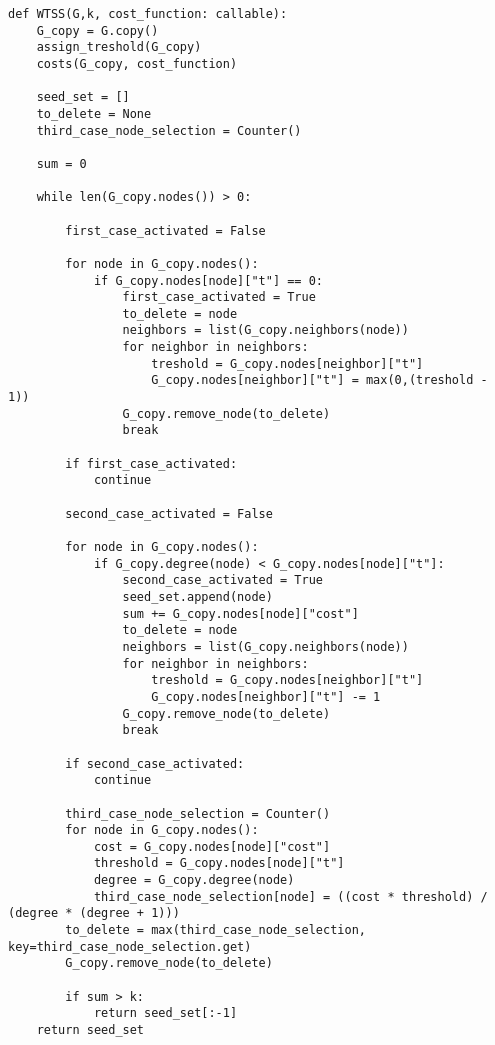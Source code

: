 \begin{code}
\begin{verbatim}
def WTSS(G,k, cost_function: callable):
    G_copy = G.copy()
    assign_treshold(G_copy)
    costs(G_copy, cost_function)

    seed_set = []
    to_delete = None
    third_case_node_selection = Counter()
    
    sum = 0

    while len(G_copy.nodes()) > 0:

        first_case_activated = False

        for node in G_copy.nodes():
            if G_copy.nodes[node]["t"] == 0:
                first_case_activated = True
                to_delete = node
                neighbors = list(G_copy.neighbors(node))
                for neighbor in neighbors:
                    treshold = G_copy.nodes[neighbor]["t"]
                    G_copy.nodes[neighbor]["t"] = max(0,(treshold - 1))
                G_copy.remove_node(to_delete)
                break
        
        if first_case_activated:
            continue

        second_case_activated = False

        for node in G_copy.nodes():
            if G_copy.degree(node) < G_copy.nodes[node]["t"]:
                second_case_activated = True
                seed_set.append(node)
                sum += G_copy.nodes[node]["cost"]
                to_delete = node
                neighbors = list(G_copy.neighbors(node))
                for neighbor in neighbors:
                    treshold = G_copy.nodes[neighbor]["t"]
                    G_copy.nodes[neighbor]["t"] -= 1
                G_copy.remove_node(to_delete)
                break
        
        if second_case_activated: 
            continue

        third_case_node_selection = Counter()
        for node in G_copy.nodes():
            cost = G_copy.nodes[node]["cost"]
            threshold = G_copy.nodes[node]["t"]
            degree = G_copy.degree(node)
            third_case_node_selection[node] = ((cost * threshold) / (degree * (degree + 1)))
        to_delete = max(third_case_node_selection, key=third_case_node_selection.get)
        G_copy.remove_node(to_delete)

        if sum > k:
            return seed_set[:-1]
    return seed_set
\end{verbatim}
\end{code}

